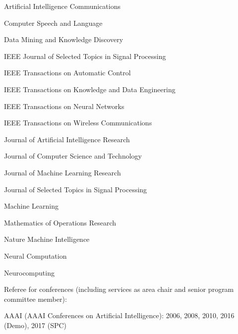 \documentclass[10pt,twoside,letterpaper]{article}
\newcommand{\negitemspace}{\vspace{1mm}}
\begin{document}
\begin{compactitem}
\begin{compactitem}
\item{Artificial Intelligence Communications}

\item{Computer Speech and Language}

\item{Data Mining and Knowledge Discovery}

\item{IEEE Journal of Selected Topics in Signal Processing}

\item{IEEE Transactions on Automatic Control}

\item{IEEE Transactions on Knowledge and Data Engineering}

\item{IEEE Transactions on Neural Networks}

\item{IEEE Transactions on Wireless Communications}

\item{Journal of Artificial Intelligence Research}

\item{Journal of Computer Science and Technology}

\item{Journal of Machine Learning Research}

\item{Journal of Selected Topics in Signal Processing}

\item{Machine Learning}

\item{Mathematics of Operations Research}

\item{Nature Machine Intelligence}

\item{Neural Computation}

\item{Neurocomputing}

\end{compactitem} \negitemspace

\item{Referee for conferences (including services as area chair and senior program committee member):}

\begin{compactitem}

\item{AAAI (AAAI Conferences on Artificial Intelligence): 2006, 2008, 2010, 2016 (Demo), 2017 (SPC)}


\end{compactitem}
\end{compactitem}
\end{document}
